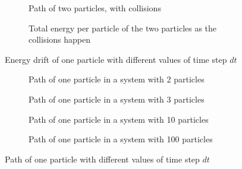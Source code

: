 \documentclass[10pt,a4paper,aps,twocolumn,secnumarabic,numerical,balancelastpage,nofootinbib,superscriptaddress]{revtex4-2}
\begin{document}
		\begin{figure*}[htb]
			\centering
			\begin{subfigure}{.45\textwidth}
				\hspace*{-2cm}\scalebox{0.8}{}
				\caption{Path of two particles, with collisions}
			\end{subfigure}
			\begin{subfigure}{.45\textwidth}
				\scalebox{0.6}{}
				\caption{Total energy per particle of the two particles as the collisions happen}
			\end{subfigure}
			\caption{Energy drift of one particle with different values of time step $dt$}
		\end{figure*}
		
		
		\begin{figure*}[htb]
			\centering
			\begin{subfigure}{.45\textwidth}
				\hspace*{-2.6cm}\scalebox{0.9}{}
				\caption{Path of one particle in a system with 2 particles}
			\end{subfigure}
			\begin{subfigure}{.45\textwidth}
				\hspace*{-2.6cm}\scalebox{0.9}{}
				\caption{Path of one particle in a system with 3 particles}
			\end{subfigure}
			\begin{subfigure}{.45\textwidth}
				\hspace*{-2.6cm}\scalebox{0.9}{}
				\caption{Path of one particle in a system with 10 particles}
			\end{subfigure}
			\begin{subfigure}{.45\textwidth}
				\hspace*{-2.6cm}\scalebox{0.9}{}
				\caption{Path of one particle in a system with 100 particles}
			\end{subfigure}
			\caption{Path of one particle with different values of time step $dt$}
		\end{figure*}
	
\end{document}
